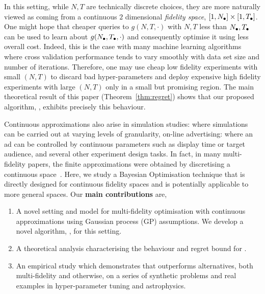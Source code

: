 In this setting, while $N,T$ are technically discrete choices, they are more naturally
viewed as coming from a continuous $2$
dimensional \emph{fidelity space}, $[1, N_{{\bullet}}]\times[1,T_{{\bullet}}]$.
One might hope that cheaper queries to $g(N,T,\cdot)$ with $N,T$ less than
$N_{{\bullet}},T_{{\bullet}}$ can be used to learn about $g(N_{{\bullet}}, T_{{\bullet}},\cdot)$ and consequently
optimise it using less overall cost.
Indeed, this is the case with many machine learning algorithms where cross
validation performance tends to vary smoothly with data set size and number of iterations.
Therefore, one may use cheap low fidelity experiments with small $(N, T)$ to discard
bad hyper-parameters and deploy expensive high fidelity experiments with large
$(N,T)$ only in a small but promising region.
The main theoretical result of this paper (Theorem~\ref{thm:regret}) shows that our proposed algorithm, \boca{}, exhibits precisely this behaviour. 

Continuous approximations also arise in
simulation studies:
where simulations can be carried out at varying levels of granularity,
on-line advertising: where an ad can be controlled by continuous
parameters such as display time or target audience, and several other
experiment design tasks.
In fact, in many multi-fidelity papers, the finite approximations were
obtained by discretising
a continuous space~\citep{kandasamy16mfbo,huang06mfKriging}.
Here, we study a Bayesian Optimisation technique that is directly designed for
continuous fidelity spaces and
is potentially applicable to more general spaces.
Our \textbf{main contributions} are,\hspace{-0.1in}
\vspace{-0.15in}
\begin{enumerate}
\item A novel setting and model for multi-fidelity optimisation with continuous
approximations using Gaussian process (GP) assumptions.
We develop a novel algorithm, \boca, for this setting.
\vspace{-0.10in}
\item A theoretical analysis characterising the behaviour and regret bound for \boca.
\vspace{-0.10in}
\item An empirical study which demonstrates that \bocas outperforms alternatives,
  both multi-fidelity and otherwise,
  on a series of synthetic problems and real examples in hyper-parameter tuning
  and astrophysics.
\end{enumerate}


